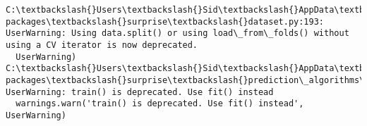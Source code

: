\documentclass[11pt]{article}
\begin{document}
    \begin{Verbatim}[commandchars=\\\{\}]
C:\textbackslash{}Users\textbackslash{}Sid\textbackslash{}AppData\textbackslash{}Local\textbackslash{}conda\textbackslash{}conda\textbackslash{}envs\textbackslash{}cten\textbackslash{}lib\textbackslash{}site-packages\textbackslash{}surprise\textbackslash{}dataset.py:193: UserWarning: Using data.split() or using load\_from\_folds() without using a CV iterator is now deprecated. 
  UserWarning)
C:\textbackslash{}Users\textbackslash{}Sid\textbackslash{}AppData\textbackslash{}Local\textbackslash{}conda\textbackslash{}conda\textbackslash{}envs\textbackslash{}cten\textbackslash{}lib\textbackslash{}site-packages\textbackslash{}surprise\textbackslash{}prediction\_algorithms\textbackslash{}algo\_base.py:51: UserWarning: train() is deprecated. Use fit() instead
  warnings.warn('train() is deprecated. Use fit() instead', UserWarning)

    \end{Verbatim}
\end{document}
